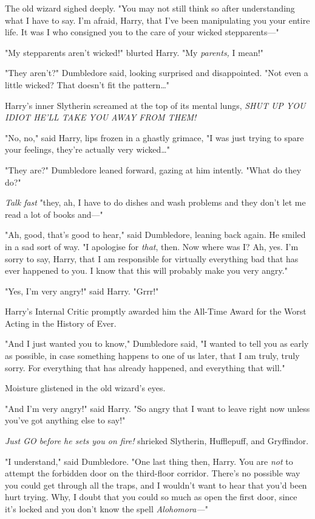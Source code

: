 The old wizard sighed deeply. "You may not still think so after understanding
what I have to say. I'm afraid, Harry, that I've been manipulating you your
entire life. It was I who consigned you to the care of your wicked
stepparents---"

"My stepparents aren't wicked!" blurted Harry. "My \emph{parents,} I mean!"

"They aren't?" Dumbledore said, looking surprised and disappointed. "Not even a
little wicked? That doesn't fit the pattern{\ldots}"

Harry's inner Slytherin screamed at the top of its mental lungs, \emph{SHUT UP
YOU IDIOT HE'LL TAKE YOU AWAY FROM THEM!}

"No, no," said Harry, lips frozen in a ghastly grimace, "I was just trying to
spare your feelings, they're actually very wicked{\ldots}"

"They are?" Dumbledore leaned forward, gazing at him intently. "What do they
do?"

\emph{Talk fast} "they, ah, I have to do dishes and wash problems and they
don't let me read a lot of books and---"

"Ah, good, that's good to hear," said Dumbledore, leaning back again. He smiled
in a sad sort of way. "I apologise for \emph{that}, then. Now where was I? Ah,
yes. I'm sorry to say, Harry, that I am responsible for virtually everything
bad that has ever happened to you. I know that this will probably make you very
angry."

"Yes, I'm very angry!" said Harry. "Grrr!"

Harry's Internal Critic promptly awarded him the All-Time Award for the Worst
Acting in the History of Ever.

"And I just wanted you to know," Dumbledore said, "I wanted to tell you as
early as possible, in case something happens to one of us later, that I am
truly, truly sorry. For everything that has already happened, and everything
that will."

Moisture glistened in the old wizard's eyes.

"And I'm very angry!" said Harry. "So angry that I want to leave right now
unless you've got anything else to say!"

\emph{Just GO before he sets you on fire!} shrieked Slytherin, Hufflepuff, and
Gryffindor.

"I understand," said Dumbledore. "One last thing then, Harry. You are
\emph{not} to attempt the forbidden door on the third-floor corridor. There's
no possible way you could get through all the traps, and I wouldn't want to
hear that you'd been hurt trying. Why, I doubt that you could so much as open
the first door, since it's locked and you don't know the spell
\emph{Alohomora---}"

